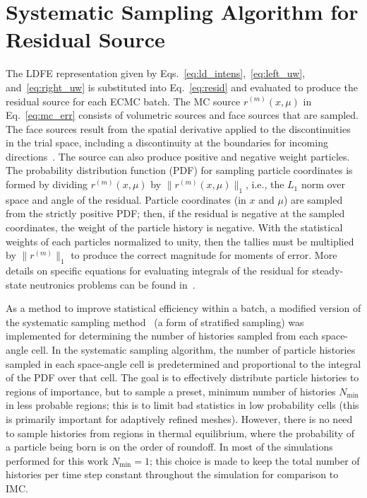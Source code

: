 \section{Systematic Sampling Algorithm for Residual Source}
\label{sec:systematic_sampling}

The LDFE representation given by Eqs.~\eqref{eq:ld_intens},~\eqref{eq:left_uw},
and~\eqref{eq:right_uw} is substituted into Eq.~\eqref{eq:resid} and evaluated
to produce the residual source for each ECMC batch.  The MC source
$r^{(m)}(x,\mu)$ in Eq.~\eqref{eq:mc_err} consists of volumetric sources and
face sources that are sampled.  The face sources result from the spatial derivative applied to
the discontinuities in the trial space, including a discontinuity at the boundaries for
incoming directions~\cite{jake}.  The source can also produce positive and
negative weight particles.  The probability distribution function (PDF) for
sampling particle coordinates is formed by dividing $r^{(m)}(x,\mu)$ by $\|r^{(m)}(x,\mu)\|_1$,
i.e., the $L_1$ norm over space and angle of the residual.  Particle coordinates (in $x$ and $\mu$)
are sampled from the strictly positive PDF; then, if the residual is negative at the sampled coordinates, the weight of the
particle history is negative. With
the statistical weights of each particles normalized to unity, then the tallies must be multiplied
by $\|r^{(m)}\|_1$ to produce the correct magnitude for moments of error.
  More details on specific equations for evaluating integrals of the
residual for steady-state neutronics problems can be found in~\cite{jake}.  
 
As a method to improve statistical efficiency within a batch, a modified version of the systematic
sampling method~\cite{shultis_mc} (a form of stratified sampling) was implemented for determining the number of
histories sampled from each space-angle cell.  In the systematic sampling algorithm, the
number of particle histories sampled in each space-angle cell is predetermined and
proportional to the integral of the
PDF over that cell.  The goal is to effectively distribute particle histories to regions of
importance, but to sample a preset, minimum number of histories $N_{\min}$ in less probable
regions; this is to limit bad statistics in low probability cells (this is primarily important for adaptively
refined meshes).  However, there is no need to sample histories
from regions in thermal equilibrium, where the probability of a particle being born is on
the order of roundoff.  In most of the simulations performed for this work
$N_{\min}=1$; this choice is made to keep the total number of histories per time
step constant throughout the simulation for comparison to IMC.  


